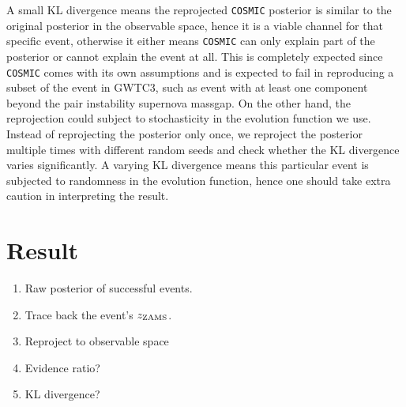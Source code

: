 \documentclass[twocolumn]{aastex631}
\begin{document}
A small KL divergence means the reprojected \texttt{COSMIC} posterior is similar to the original posterior in the observable space, hence it is a viable channel for that specific event, otherwise it either means \texttt{COSMIC} can only explain part of the posterior or cannot explain the event at all.
This is completely expected since \texttt{COSMIC} comes with its own assumptions and is expected to fail in reproducing a subset of the event in GWTC3, such as event with at least one component beyond the pair instability supernova massgap.
On the other hand, the reprojection could subject to stochasticity in the evolution function we use.
Instead of reprojecting the posterior only once, we reproject the posterior multiple times with different random seeds and check whether the KL divergence varies significantly.
A varying KL divergence means this particular event is subjected to randomness in the evolution function, hence one should take extra caution in interpreting the result.


\section{Result}
\label{sec:result}

\begin{enumerate}
\item Raw posterior of successful events.
\item Trace back the event's $z_{\rm ZAMS}$.
\item Reproject to observable space
\item Evidence ratio?
\item KL divergence?
\end{enumerate}
\end{document}
